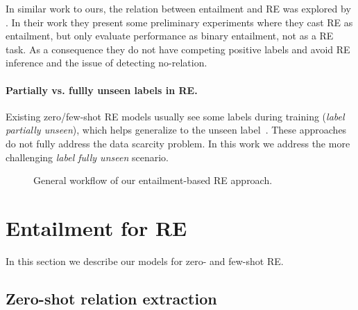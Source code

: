 \documentclass[11pt]{article}
\begin{document}
In similar work to ours, the relation between entailment and RE was explored by  \citet{obamuyide-vlachos-2018-zero}. In their work they present some preliminary experiments where they cast RE as entailment, but only evaluate performance as binary entailment, not as a RE task. As a consequence they do not have competing positive labels and avoid RE inference and the issue of detecting no-relation.







\paragraph{Partially vs. fullly unseen labels in RE.} Existing zero/few-shot RE models usually see some labels during training (\emph{label partially unseen}), which helps generalize to the unseen label~\cite{levy-etal-2017-zero, obamuyide-vlachos-2018-zero, han-etal-2018-fewrel, chen2021zsbert}. These approaches do not fully address the data scarcity problem. In this work we address the more challenging \emph{label fully unseen} scenario.















\begin{figure*}[ht]
    \centering
    \caption{General workflow of our entailment-based RE approach.}
    \label{fig:architecture}
\end{figure*}

\section{Entailment for RE}
\label{sec:systems}

In this section we describe our models for zero- and few-shot RE. 





\subsection{Zero-shot relation extraction} 
\label{ssed:zeroshot}
\end{document}
